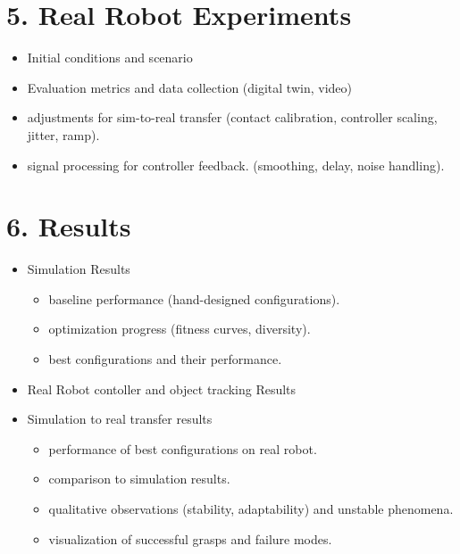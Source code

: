 \documentclass[12pt,a4paper]{article}
\begin{document}
\section*{5. Real Robot Experiments}
\begin{itemize}
  \item Initial conditions and scenario
  \item Evaluation metrics and data collection (digital twin, video)
  \item adjustments for sim-to-real transfer (contact calibration, controller scaling, jitter, ramp).
  \item signal processing for controller feedback. (smoothing, delay, noise handling).
\end{itemize}

\section*{6. Results} %
\begin{itemize}
  \item Simulation Results
  \begin{itemize}
    \item baseline performance (hand-designed configurations).
    \item optimization progress (fitness curves, diversity).
    \item best configurations and their performance.
  \end{itemize}
  \item Real Robot contoller and object tracking Results
  \item Simulation to real transfer results
  \begin{itemize}
    \item performance of best configurations on real robot.
    \item comparison to simulation results.
    \item qualitative observations (stability, adaptability) and unstable phenomena.
    \item visualization of successful grasps and failure modes.
  \end{itemize}
\end{itemize}

\end{document}

